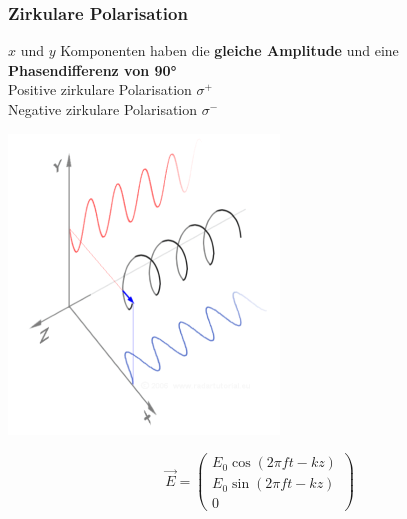 


\subsubsection{Zirkulare Polarisation}

$x$ und $y$ Komponenten haben die \textbf{gleiche Amplitude} und eine \textbf{Phasendifferenz von 90°} \\

Positive zirkulare Polarisation $\sigma ^+$ \\
Negative zirkulare Polarisation $\sigma ^-$ \\


\begin{minipage}{0.48\linewidth}
\includegraphics[width=0.8\linewidth]{Bilder/Wellen-Optik/Zirkulare_Polarisation}
\end{minipage}
\hfill
\begin{minipage}{0.48\linewidth}
$$ \boxed{ \vec{E} = \begin{pmatrix} E_0 \cos(2 \pi ft-kz) \\ E_0 \sin(2 \pi ft -kz) \\ 0 \end{pmatrix}  } $$

\end{minipage}

\vfill\null
\columnbreak

